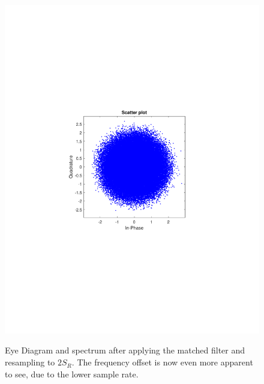 \begin{refsection}
\begin{figure}[H]
\begin{minipage}{0.30\textwidth}
		\includegraphics[clip, trim=4cm 8cm 4cm 8cm, width=1\textwidth]{./sdf/m_qam_system/figures/expResults/intradyne/2_const_4GBdInSig13dB_AfMF.pdf}
		\label{fig:4GBdSpecBefFec}
	\end{minipage}
	\caption{Eye Diagram and spectrum after applying the matched filter and resampling to $2 S_R$. The frequency offset is now even more apparent to see, due to the lower sample rate.}
	\label{fig:4GBMF}
\end{figure}


\end{refsection}
